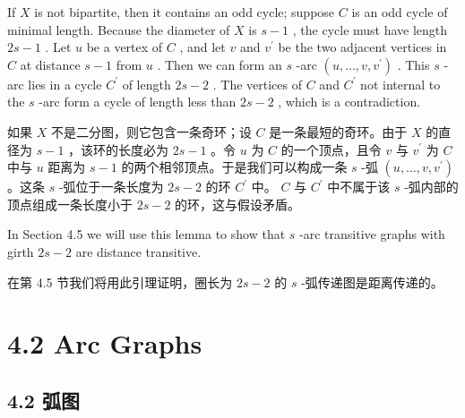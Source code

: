 \documentclass[10pt]{article}
\begin{document}
If \(X\) is not bipartite, then it contains an odd cycle; suppose \(C\) is an odd cycle of minimal length. Because the diameter of \(X\) is \(s - 1\) , the cycle must have length \({2s} - 1\) . Let \(u\) be a vertex of \(C\) , and let \(v\) and \({v}^{\prime }\) be the two adjacent vertices in \(C\) at distance \(s - 1\) from \(u\) . Then we can form an \(s\) -arc \(\left( {u,\ldots ,v,{v}^{\prime }}\right)\) . This \(s\) -arc lies in a cycle \({C}^{\prime }\) of length \({2s} - 2\) . The vertices of \(C\) and \({C}^{\prime }\) not internal to the \(s\) -arc form a cycle of length less than \({2s} - 2\) , which is a contradiction.

\begin{tcolorbox}\relax
如果 \(X\) 不是二分图，则它包含一条奇环；设 \(C\) 是一条最短的奇环。由于 \(X\) 的直径为 \(s - 1\) ，该环的长度必为 \({2s} - 1\) 。令 \(u\) 为 \(C\) 的一个顶点，且令 \(v\) 与 \({v}^{\prime }\) 为 \(C\) 中与 \(u\) 距离为 \(s - 1\) 的两个相邻顶点。于是我们可以构成一条 \(s\) -弧 \(\left( {u,\ldots ,v,{v}^{\prime }}\right)\) 。这条 \(s\) -弧位于一条长度为 \({2s} - 2\) 的环 \({C}^{\prime }\) 中。 \(C\) 与 \({C}^{\prime }\) 中不属于该 \(s\) -弧内部的顶点组成一条长度小于 \({2s} - 2\) 的环，这与假设矛盾。
\end{tcolorbox}

In Section 4.5 we will use this lemma to show that \(s\) -arc transitive graphs with girth \({2s} - 2\) are distance transitive.

\begin{tcolorbox}\relax
在第 4.5 节我们将用此引理证明，圈长为 \({2s} - 2\) 的 \(s\) -弧传递图是距离传递的。
\end{tcolorbox}

\section*{4.2 Arc Graphs}

\begin{tcolorbox}\relax
\section*{4.2 弧图}
\end{tcolorbox}
\end{document}

